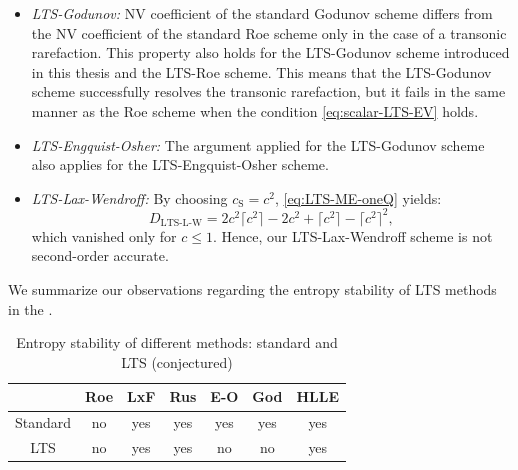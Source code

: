 \begin{itemize}
\item \textit{LTS-Godunov:} NV coefficient of the standard Godunov scheme differs from the NV coefficient of the standard Roe scheme only in the case of a transonic rarefaction. This property also holds for the LTS-Godunov scheme introduced in this thesis and the LTS-Roe scheme. This means that the LTS-Godunov scheme successfully resolves the transonic rarefaction, but it fails in the same manner as the Roe scheme when the condition \eqref{eq:scalar-LTS-EV} holds.
\item \textit{LTS-Engquist-Osher:} The argument applied for the LTS-Godunov scheme also applies for the LTS-Engquist-Osher scheme.
\item \textit{LTS-Lax-Wendroff:} By choosing $ c_\text{S} = c^2 $, \eqref{eq:LTS-ME-oneQ} yields:
\begin{equation}
D_\text{LTS-L-W} = 2 c^2 \lceil c^2 \rceil - 2c^2 + \lceil c^2 \rceil - \lceil c^2 \rceil^2,
\end{equation}
which vanished only for $ c \leq 1 $. Hence, our LTS-Lax-Wendroff scheme is not second-order accurate.
\end{itemize}

We summarize our observations regarding the entropy stability of LTS methods in the .

\begin{table}[h!]
\centering

\captionsetup{width=0.65\textwidth}
\caption[whatever]{Entropy stability of different methods: standard and LTS (conjectured\footnotemark)}
\begin{tabular}{@{} c c c c c c c @{}}
\toprule
& Roe & LxF & Rus & E-O & God & HLLE
\\\midrule
Standard  & no & yes & yes & yes & yes & yes \\ 
LTS       & no & yes & yes & no  & no  & yes \\ 
\bottomrule
\end{tabular}

\label{tabl:EntropyStability}
\end{table}


